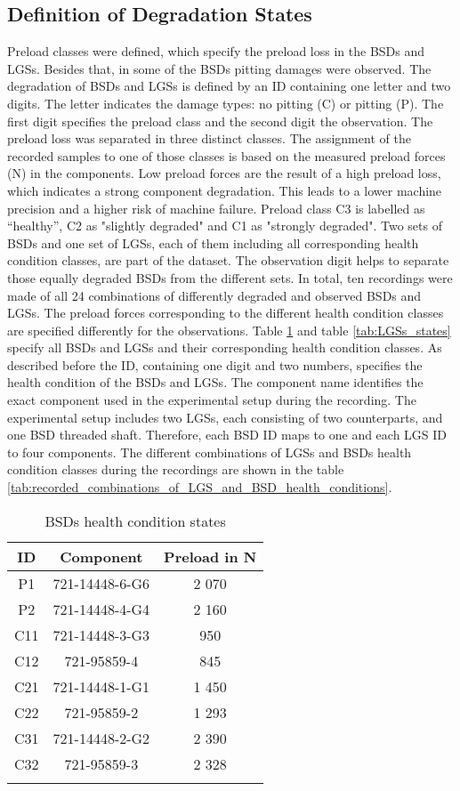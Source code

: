 \subsection{Definition of Degradation States}
Preload classes were defined, which specify the preload loss in the BSDs and LGSs. Besides that, in some of the BSDs pitting damages were observed. The degradation of BSDs and LGSs is defined by an ID containing one letter and two digits. The letter indicates the damage types: no pitting (C) or pitting (P). The first digit specifies the preload class and the second digit the observation. The preload loss was separated in three distinct classes. The assignment of the recorded samples to one of those classes is based on the measured preload forces (N) in the components. Low preload forces are the result of a high preload loss, which indicates a strong component degradation. This leads to a lower machine precision and a higher risk of machine failure. Preload class C3 is labelled as “healthy”, C2 as "slightly degraded" and C1 as "strongly degraded". Two sets of BSDs and one set of LGSs, each of them including all corresponding health condition classes, are part of the dataset. The observation digit helps to separate those equally degraded BSDs from the different sets. In total, ten recordings were made of all 24 combinations of differently degraded and observed BSDs and LGSs. The preload forces corresponding to the different health condition classes are specified differently for the observations. Table \ref {tab:BSDs_states} and table \ref {tab:LGSs_states} specify all BSDs and LGSs and their corresponding health condition classes. As described before the ID, containing one digit and two numbers, specifies the health condition of the BSDs and LGSs. The component name identifies the exact component used in the experimental setup during the recording. The experimental setup includes two LGSs, each consisting of two counterparts, and one BSD threaded shaft. Therefore, each BSD ID maps to one and each LGS ID to four components. The different combinations of LGSs and BSDs health condition classes during the recordings are shown in the table \ref{tab:recorded_combinations_of_LGS_and_BSD_health_conditions}.


\begin{center}
\begin{longtable}{c c c} 
\toprule
 ID & Component & Preload in N \\ [0.5ex] 
\midrule
 P1 & 721-14448-6-G6 & 2 070 \\ 
 P2 & 721-14448-4-G4 & 2 160 \\ 
 C11 & 721-14448-3-G3 & 950 \\ 
 C12 & 721-95859-4 & 845 \\ 
 C21  & 721-14448-1-G1 & 1 450 \\ [1ex] 
 C22  & 721-95859-2 & 1 293 \\ [1ex] 
 C31  & 721-14448-2-G2 & 2 390 \\ [1ex] 
 C32  & 721-95859-3 & 2 328 \\ [1ex] 
\bottomrule
\caption {BSDs health condition states}
\label {tab:BSDs_states}
\end{longtable}
\end{center}

